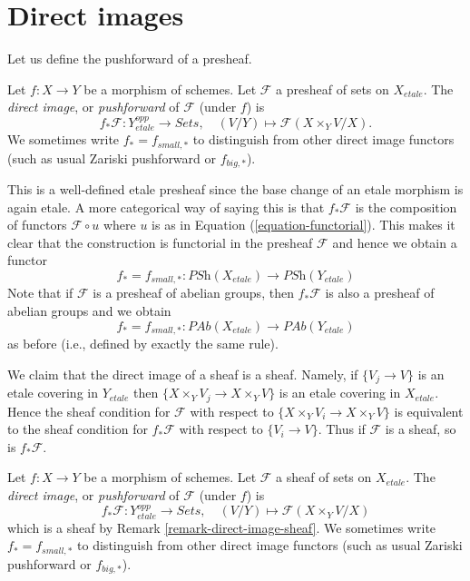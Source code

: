 \section{Direct images}
\label{section-direct-image}

\noindent
Let us define the pushforward of a presheaf.

\begin{definition}
\label{definition-direct-image-presheaf}
Let $f: X\to Y$ be a morphism of schemes.
Let $\mathcal{F} $ a presheaf of sets on $X_{etale}$.
The {\it direct image}, or {\it pushforward} of $\mathcal{F}$
(under $f$) is
$$
f_*\mathcal{F} : Y_{etale}^{opp} \longrightarrow \textit{Sets},\quad
(V/Y) \longmapsto \mathcal{F}(X\times_Y V/X).
$$
We sometimes write $f_* = f_{small, *}$ to distinguish from other
direct image functors (such as usual Zariski pushforward or $f_{big, *}$).
\end{definition}

\noindent
This is a well-defined etale presheaf since the base change of an etale
morphism is again etale. A more categorical way of saying this is that
$f_*\mathcal{F}$ is the composition of functors $\mathcal{F} \circ u$
where $u$ is as in Equation (\ref{equation-functorial}). This makes it
clear that the construction is functorial in the presheaf
$\mathcal{F}$ and hence we obtain a functor
$$
f_* = f_{small, *} :
\textit{PSh}(X_{etale})
\longrightarrow
\textit{PSh}(Y_{etale})
$$
Note that if $\mathcal{F}$ is a presheaf of abelian groups, then
$f_*\mathcal{F}$ is also a presheaf of abelian groups and we obtain
$$
f_* = f_{small, *} :
\textit{PAb}(X_{etale})
\longrightarrow
\textit{PAb}(Y_{etale})
$$
as before (i.e., defined by exactly the same rule).

\begin{remark}
\label{remark-direct-image-sheaf}
We claim that the direct image of a sheaf is a sheaf.
Namely, if $\{V_j \to V\}$ is an etale covering in $Y_{etale}$
then $\{X \times_Y V_j \to X \times_Y V\}$ is an etale covering in
$X_{etale}$. Hence the sheaf condition for $\mathcal{F}$ with respect to
$\{X \times_Y V_i \to X \times_Y V\}$
is equivalent to the sheaf condition for $f_*\mathcal{F}$ with respect to
$\{V_i \to V\}$. Thus if $\mathcal{F}$ is a sheaf, so is
$f_*\mathcal{F}$.
\end{remark}

\begin{definition}
\label{definition-direct-image-sheaf}
Let $f: X\to Y$ be a morphism of schemes.
Let $\mathcal{F} $ a sheaf of sets on $X_{etale}$.
The {\it direct image}, or {\it pushforward} of $\mathcal{F}$
(under $f$) is
$$
f_*\mathcal{F} : Y_{etale}^{opp} \longrightarrow \textit{Sets},\quad
(V/Y) \longmapsto \mathcal{F}(X\times_Y V/X)
$$
which is a sheaf by
Remark \ref{remark-direct-image-sheaf}.
We sometimes write $f_* = f_{small, *}$ to distinguish from other
direct image functors (such as usual Zariski pushforward or $f_{big, *}$).
\end{definition}

